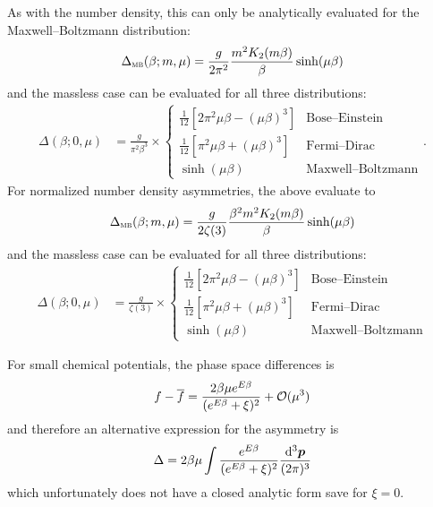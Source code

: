 \documentclass[
  a4paper,             %
  11pt,                %
  oneside,             %
  onecolumn,           %
  bibliography=totoc,  %
  final,               %
]{scrartcl}
\begin{document}
As with the number density, this can only be analytically evaluated for the
Maxwell--Boltzmann distribution:
\begin{equation}
  \Delta_{\textsc{mb}}(\beta; m, \mu)
  = \frac{g}{2 \pi^2} \frac{m^2 K_2(m \beta)}{\beta} \sinh(\mu \beta)
\end{equation}
and the massless case can be evaluated for all three distributions:
\begin{subequations}
  \begin{align}
    \Delta(\beta; 0, \mu) &= \frac{g}{\pi^2 \beta^3} \times \begin{cases}
      \frac{1}{12} \left[ 2 \pi^2 \mu\beta - (\mu\beta)^3 \right] & \text{Bose--Einstein} \\
      \frac{1}{12} \left[ \pi^2 \mu\beta + (\mu\beta)^3 \right] & \text{Fermi--Dirac} \\
      \sinh(\mu \beta) & \text{Maxwell--Boltzmann}
    \end{cases}.
  \end{align}
\end{subequations}
For normalized number density asymmetries, the above evaluate to
\begin{equation}
  \Delta_{\textsc{mb}}(\beta; m, \mu)
  = \frac{g}{2 \zeta(3)} \frac{\beta^2 m^2 K_2(m \beta)}{\beta} \sinh(\mu \beta)
\end{equation}
and the massless case can be evaluated for all three distributions:
\begin{subequations}
  \begin{align}
    \Delta(\beta; 0, \mu) &= \frac{g}{\zeta(3)} \times \begin{cases}
      \frac{1}{12} \left[ 2 \pi^2 \mu\beta - (\mu\beta)^3 \right] & \text{Bose--Einstein} \\
      \frac{1}{12} \left[ \pi^2 \mu\beta + (\mu\beta)^3 \right] & \text{Fermi--Dirac} \\
      \sinh(\mu \beta) & \text{Maxwell--Boltzmann}
    \end{cases}
  \end{align}
\end{subequations}

For small chemical potentials, the phase space differences is
\begin{equation}
  f - \overline f = \frac{2 \beta \mu e^{E \beta}}{(e^{E \beta} + \xi)^2} + \mathcal{O}(\mu^3)
\end{equation}
and therefore an alternative expression for the asymmetry is
\begin{equation}
  \Delta = 2 \beta \mu \int \frac{e^{E \beta}}{(e^{E \beta} + \xi)^2} \ddbar^3{\vt p}
\end{equation}
which unfortunately does not have a closed analytic form save for \(\xi = 0\).
\end{document}

